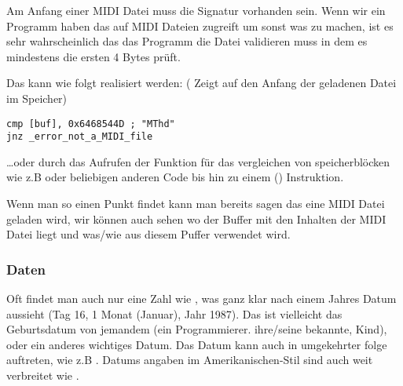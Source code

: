 
Am Anfang einer MIDI Datei muss die  Signatur vorhanden sein.
Wenn wir ein Programm haben das auf MIDI Dateien zugreift um sonst was zu machen,
ist es sehr wahrscheinlich das das Programm die Datei validieren muss in dem es
mindestens die ersten 4 Bytes prüft.


Das kann wie folgt realisiert werden: %
( Zeigt auf den Anfang der geladenen Datei im Speicher) 


\begin{lstlisting}[style=customasmx86]
cmp [buf], 0x6468544D ; "MThd"
jnz _error_not_a_MIDI_file
\end{lstlisting}


\dots oder durch das Aufrufen der Funktion für das vergleichen von speicherblöcken wie z.B  oder 
beliebigen anderen Code bis hin zu einem  () Instruktion.


Wenn man so einen Punkt findet kann man bereits sagen das eine MIDI Datei geladen wird, %
wir können auch sehen wo der Buffer mit den Inhalten der MIDI Datei liegt und was/wie aus diesem
Puffer verwendet wird.


\subsubsection{Daten}


Oft findet man auch nur eine Zahl wie , was ganz klar nach einem Jahres Datum aussieht (Tag 16,  1 Monat (Januar),  Jahr 1987).
Das ist vielleicht das Geburtsdatum von jemandem (ein Programmierer. ihre/seine bekannte, Kind), oder ein anderes wichtiges Datum.
Das Datum kann auch in umgekehrter folge auftreten, wie z.B . 
Datums angaben im Amerikanischen-Stil sind auch weit verbreitet wie .

